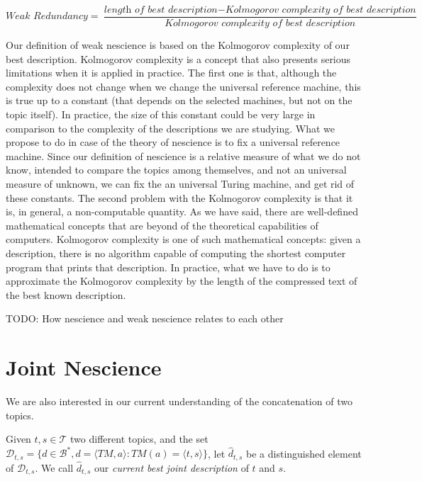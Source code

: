 \[
\textit{Weak Redundancy} = \frac{\textit{length of best description} - \textit{Kolmogorov complexity of best description}}{\textit{Kolmogorov complexity of best description}}
\]

Our definition of weak nescience is based on the Kolmogorov complexity of our best description. Kolmogorov complexity is a concept that also presents serious limitations when it is applied in practice. The first one is that, although the complexity does not change when we change the universal reference machine, this is true up to a constant (that depends on the selected machines, but not on the topic itself). In practice, the size of this constant could be very large in comparison to the complexity of the descriptions we are studying. What we propose to do in case of the theory of nescience is to fix a universal reference machine. Since our definition of nescience is a relative measure of what we do not know, intended to compare the topics among themselves, and not an universal measure of unknown, we can fix the an universal Turing machine, and get rid of these constants. The second problem with the Kolmogorov complexity is that it is, in general, a non-computable quantity. As we have said, there are well-defined mathematical concepts that are beyond of the theoretical capabilities of computers. Kolmogorov complexity is one of such mathematical concepts: given a description, there is no algorithm capable of computing the shortest computer program that prints that description. In practice, what we have to do is to approximate the Kolmogorov complexity by the length of the compressed text of the best known description.

{\color{red} TODO: How nescience and weak nescience relates to each other}

%
%

\section{Joint Nescience}

We are also interested in our current understanding of the concatenation of two topics.

\begin{definition}
Given $t,s \in \mathcal{T}$ two different topics, and the set $\mathcal{D}_{t,s} = \{ d \in \mathcal{B}^\ast, d = \langle TM,a \rangle : TM(a) = \langle t,s \rangle \}$, let $\hat{d}_{t,s}$ be a distinguished element of $\mathcal{D}_{t,s}$. We call $\hat{d}_{t,s}$ our \emph{current best joint description} of $t$ and $s$.
\end{definition}

